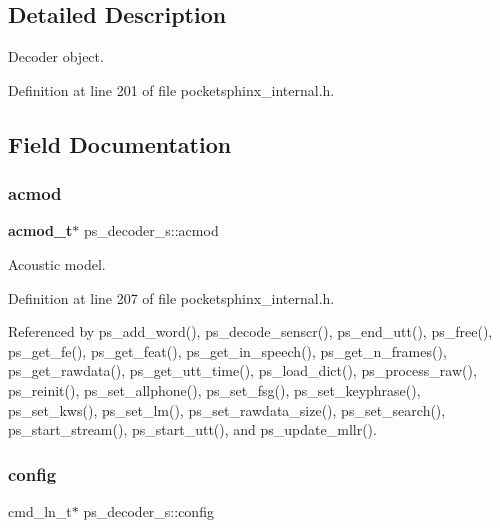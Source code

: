 \subsection{Detailed Description}
Decoder object. 

Definition at line 201 of file pocketsphinx\+\_\+internal.\+h.



\subsection{Field Documentation}
\mbox{\label{structps__decoder__s_af834d2bc1d44c1d9ef607b025413a0b8}} 
\subsubsection{acmod}
{\footnotesize\ttfamily \textbf{ acmod\+\_\+t}$\ast$ ps\+\_\+decoder\+\_\+s\+::acmod}



Acoustic model. 



Definition at line 207 of file pocketsphinx\+\_\+internal.\+h.



Referenced by ps\+\_\+add\+\_\+word(), ps\+\_\+decode\+\_\+senscr(), ps\+\_\+end\+\_\+utt(), ps\+\_\+free(), ps\+\_\+get\+\_\+fe(), ps\+\_\+get\+\_\+feat(), ps\+\_\+get\+\_\+in\+\_\+speech(), ps\+\_\+get\+\_\+n\+\_\+frames(), ps\+\_\+get\+\_\+rawdata(), ps\+\_\+get\+\_\+utt\+\_\+time(), ps\+\_\+load\+\_\+dict(), ps\+\_\+process\+\_\+raw(), ps\+\_\+reinit(), ps\+\_\+set\+\_\+allphone(), ps\+\_\+set\+\_\+fsg(), ps\+\_\+set\+\_\+keyphrase(), ps\+\_\+set\+\_\+kws(), ps\+\_\+set\+\_\+lm(), ps\+\_\+set\+\_\+rawdata\+\_\+size(), ps\+\_\+set\+\_\+search(), ps\+\_\+start\+\_\+stream(), ps\+\_\+start\+\_\+utt(), and ps\+\_\+update\+\_\+mllr().

\mbox{\label{structps__decoder__s_a0565ed97b32408bd05c8104f020cef05}} 
\subsubsection{config}
{\footnotesize\ttfamily cmd\+\_\+ln\+\_\+t$\ast$ ps\+\_\+decoder\+\_\+s\+::config}



